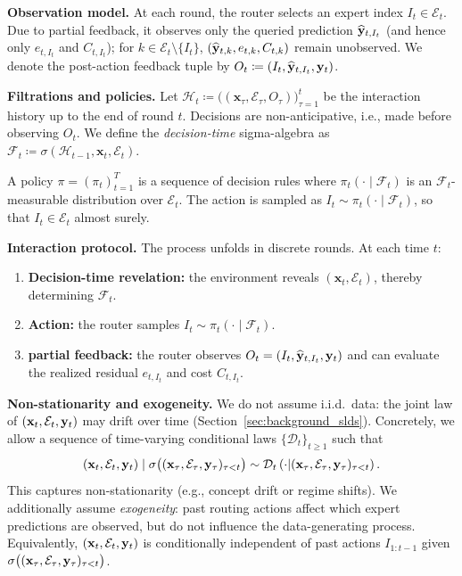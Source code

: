 \textbf{Observation model.}
At each round, the router selects an expert index \(I_t\in\mathcal{E}_t\). Due to partial
feedback, it observes only the queried prediction \(\widehat{\mathbf{y}}_{t,I_t}\) (and hence only
\(e_{t,I_t}\) and \(C_{t,I_t}\)); for \(k\in\mathcal{E}_t\setminus\{I_t\}\),
\((\widehat{\mathbf{y}}_{t,k},e_{t,k},C_{t,k})\) remain
unobserved. We denote the post-action feedback tuple by \(O_t \coloneqq (I_t,\widehat{\mathbf{y}}_{t,I_t},\mathbf{y}_t)\).

\textbf{Filtrations and policies.}
Let \(\mathcal{H}_{t}\coloneqq \big((\mathbf{x}_\tau,\mathcal{E}_\tau,O_\tau)\big)_{\tau=1}^{t}\)
be the interaction history up to the end of round \(t\).
Decisions are non-anticipative, i.e., made before observing \(O_t\).
We define the \emph{decision-time} sigma-algebra as $\mathcal{F}_t \coloneqq
\sigma\left(\mathcal{H}_{t-1},\mathbf{x}_t,\mathcal{E}_t\right)$.

A policy \(\pi=(\pi_t)_{t=1}^T\) is a sequence of decision rules where
\(\pi_t(\cdot \mid \mathcal{F}_t)\) is an \(\mathcal{F}_t\)-measurable distribution over
\(\mathcal{E}_t\).
The action is sampled as \(I_t \sim \pi_t(\cdot \mid \mathcal{F}_t)\), so that
\(I_t\in\mathcal{E}_t\) almost surely.

\textbf{Interaction protocol.}
The process unfolds in discrete rounds. At each time \(t\):
\begin{enumerate}[topsep=0pt,itemsep=1pt,parsep=0pt]
    \item \textbf{Decision-time revelation:} the environment reveals \((\mathbf{x}_t,\mathcal{E}_t)\),
    thereby determining \(\mathcal{F}_t\).
    \item \textbf{Action:} the router samples \(I_t \sim \pi_t(\cdot \mid \mathcal{F}_t)\).
    \item \textbf{partial feedback:} the router observes \(O_t=(I_t,\widehat{\mathbf{y}}_{t,I_t},\mathbf{y}_t)\) and can
    evaluate the realized residual \(e_{t,I_t}\) and cost \(C_{t,I_t}\).
\end{enumerate}


\textbf{Non-stationarity and exogeneity.}
We do not assume i.i.d.\ data: the joint law of \((\mathbf{x}_t,\mathcal{E}_t,\mathbf{y}_t)\) may drift over
time (Section~\ref{sec:background_slds}). Concretely, we allow a sequence of time-varying conditional
laws \(\{\mathcal{D}_t\}_{t\ge 1}\) such that
	\begin{equation*}
	    (\mathbf{x}_t,\mathcal{E}_t,\mathbf{y}_t)\mid \sigma\big((\mathbf{x}_\tau,\mathcal{E}_\tau,\mathbf{y}_\tau)_{\tau<t}\big)
	    \sim \mathcal{D}_t\left(\cdot \middle| (\mathbf{x}_\tau,\mathcal{E}_\tau,\mathbf{y}_\tau)_{\tau<t}\right).
	\end{equation*}
This captures non-stationarity (e.g., concept drift or regime shifts). We additionally assume
\emph{exogeneity}: past routing actions affect which expert predictions
are observed, but do not influence the data-generating process. Equivalently,
\((\mathbf{x}_t,\mathcal{E}_t,\mathbf{y}_t)\) is conditionally independent of past actions \(I_{1:t-1}\)
given \(\sigma\big((\mathbf{x}_\tau,\mathcal{E}_\tau,\mathbf{y}_\tau)_{\tau<t}\big)\).

